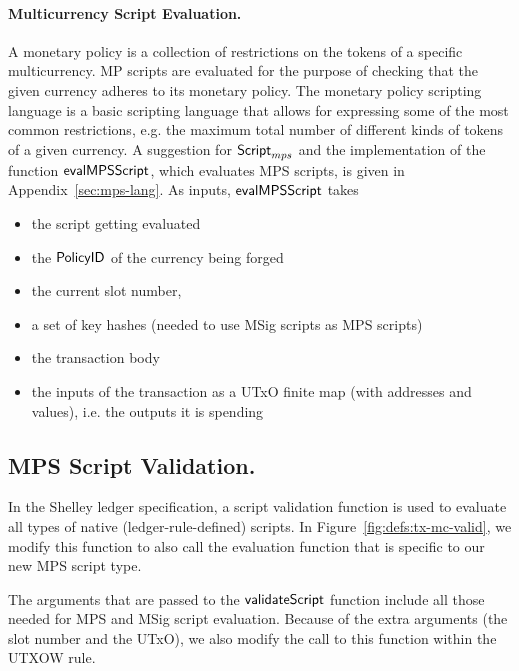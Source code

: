 \paragraph*{Multicurrency Script Evaluation.}
A monetary policy is a collection of restrictions on the tokens of a
specific multicurrency. MP scripts are evaluated for the purpose of checking that
the given currency adheres to its monetary policy. The monetary policy scripting
language is a basic scripting language that
allows for expressing some of the most common restrictions, e.g.
the maximum total number of different kinds of tokens of a given currency.
A suggestion for $\mathsf{Script}_{mps}$ and the implementation of the function
$\mathsf{evalMPSScript}$, which evaluates MPS scripts, is given in
Appendix~\ref{sec:mps-lang}. As inputs, $\mathsf{evalMPSScript}$ takes

\begin{itemize}
\item the script getting evaluated
\item the $\mathsf{PolicyID}$ of the currency being forged
\item the current slot number,
\item a set of key hashes (needed to use MSig scripts as MPS scripts)
\item the transaction body
\item the inputs of the transaction as a UTxO finite map (with addresses and values),
i.e. the outputs it is spending
\end{itemize}


\subsection*{MPS Script Validation.}

In the Shelley ledger specification, a script validation function
is used to evaluate all types of native (ledger-rule-defined) scripts.
In Figure~\ref{fig:defs:tx-mc-valid}, we modify this function to also call the
evaluation function that is specific to our new MPS script type.

The arguments that are passed to the $\mathsf{validateScript}$ function include all those
needed for MPS and MSig script evaluation. Because of the extra arguments
(the slot number and the UTxO), we also modify the call to this function
within the UTXOW rule.


